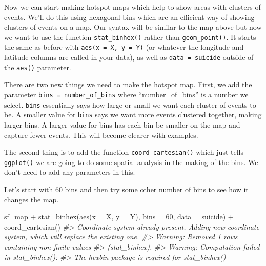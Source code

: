 \documentclass[
]{krantz}
\makeatletter
\newenvironment{Shaded}{\begin{snugshade}}{\end{snugshade}}
\newcommand{\AttributeTok}[1]{\textcolor[rgb]{0.61,0.61,0.61}{#1}}
\newcommand{\CommentTok}[1]{\textcolor[rgb]{0.37,0.37,0.37}{\textit{#1}}}
\newcommand{\DecValTok}[1]{\textcolor[rgb]{0.06,0.06,0.06}{#1}}
\newcommand{\FunctionTok}[1]{\textcolor[rgb]{0,0,0}{#1}}
\newcommand{\NormalTok}[1]{#1}
\newcommand{\SpecialCharTok}[1]{\textcolor[rgb]{0,0,0}{#1}}
\newenvironment{kframe}{%
\medskip{}
\setlength{\fboxsep}{.8em}
 \def\at@end@of@kframe{}%
 \ifinner\ifhmode%
  \def\at@end@of@kframe{\end{minipage}}%
  \begin{minipage}{\columnwidth}%
 \fi\fi%
 \def\FrameCommand##1{\hskip\@totalleftmargin \hskip-\fboxsep
 \colorbox{shadecolor}{##1}\hskip-\fboxsep
     \hskip-\linewidth \hskip-\@totalleftmargin \hskip\columnwidth}%
 \MakeFramed {\advance\hsize-\width
   \@totalleftmargin\z@ \linewidth\hsize
   \@setminipage}}%
 {\par\unskip\endMakeFramed%
 \at@end@of@kframe}
\renewenvironment{Shaded}{\begin{kframe}}{\end{kframe}}
\makeatother
\begin{document}
Now we can start making hotspot maps which help to show areas with clusters of events. We'll do this using hexagonal bins which are an efficient way of showing clusters of events on a map. Our syntax will be similar to the map above but now we want to use the function \texttt{stat\_binhex()} rather than \texttt{geom\_point()}. It starts the same as before with \texttt{aes(x\ =\ X,\ y\ =\ Y)} (or whatever the longitude and latitude columns are called in your data), as well as \texttt{data\ =\ suicide} outside of the \texttt{aes()} parameter.

There are two new things we need to make the hotspot map. First, we add the parameter \texttt{bins\ =\ number\_of\_bins} where ``number\_of\_bins'' is a number we select. \texttt{bins} essentially says how large or small we want each cluster of events to be. A smaller value for \texttt{bins} says we want more events clustered together, making larger bins. A larger value for bins has each bin be smaller on the map and capture fewer events. This will become clearer with examples.

The second thing is to add the function \texttt{coord\_cartesian()} which just tells \texttt{ggplot()} we are going to do some spatial analysis in the making of the bins. We don't need to add any parameters in this.

Let's start with 60 bins and then try some other number of bins to see how it changes the map.

\begin{Shaded}
\begin{Highlighting}[]
\NormalTok{sf\_map }\SpecialCharTok{+} \FunctionTok{stat\_binhex}\NormalTok{(}\FunctionTok{aes}\NormalTok{(}\AttributeTok{x =}\NormalTok{ X, }\AttributeTok{y =}\NormalTok{ Y), }\AttributeTok{bins =} \DecValTok{60}\NormalTok{, }\AttributeTok{data =}\NormalTok{ suicide) }\SpecialCharTok{+}
  \FunctionTok{coord\_cartesian}\NormalTok{()}
\CommentTok{\#\textgreater{} Coordinate system already present. Adding new coordinate system, which will replace the existing one.}
\CommentTok{\#\textgreater{} Warning: Removed 1 rows containing non{-}finite values}
\CommentTok{\#\textgreater{} (stat\_binhex).}
\CommentTok{\#\textgreater{} Warning: Computation failed in \textasciigrave{}stat\_binhex()\textasciigrave{}:}
\CommentTok{\#\textgreater{} The \textasciigrave{}hexbin\textasciigrave{} package is required for \textasciigrave{}stat\_binhex()\textasciigrave{}}
\end{Highlighting}
\end{Shaded}
\end{document}
